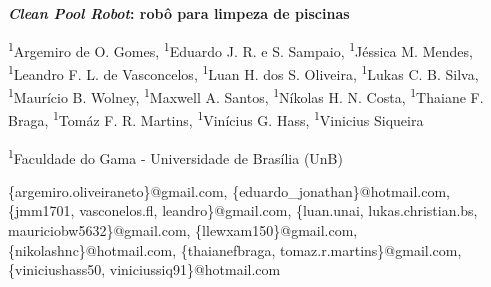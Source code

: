 \begin{report-title}
\textbf{\textit{Clean Pool Robot}: robô para limpeza de piscinas}
\end{report-title}

\begin{author-list}
\textsuperscript{1}Argemiro de O. Gomes,
\textsuperscript{1}Eduardo J. R. e S. Sampaio,
\textsuperscript{1}Jéssica M. Mendes,
\textsuperscript{1}Leandro F. L. de Vasconcelos,
\textsuperscript{1}Luan H. dos S. Oliveira,
\textsuperscript{1}Lukas C. B. Silva,
\textsuperscript{1}Maurício B. Wolney,
\textsuperscript{1}Maxwell A. Santos,
\textsuperscript{1}Níkolas H. N. Costa,
\textsuperscript{1}Thaiane F. Braga,
\textsuperscript{1}Tomáz F. R. Martins,
\textsuperscript{1}Vinícius G. Hass,
\textsuperscript{1}Vinicius Siqueira
\end{author-list}

\begin{author-address}
\textsuperscript{1}Faculdade do Gama - Universidade de Brasília (UnB)
\end{author-address}

\begin{e-mails}
\{argemiro.oliveiraneto\}@gmail.com,
\{eduardo\_jonathan\}@hotmail.com,
\{jmm1701, vasconelos.fl, leandro\}@gmail.com,
\{luan.unai, lukas.christian.bs, mauriciobw5632\}@gmail.com,
\{llewxam150\}@gmail.com,
\{nikolashnc\}@hotmail.com,
\{thaianefbraga, tomaz.r.martins\}@gmail.com,
\{viniciushass50, viniciussiq91\}@hotmail.com
\end{e-mails}
